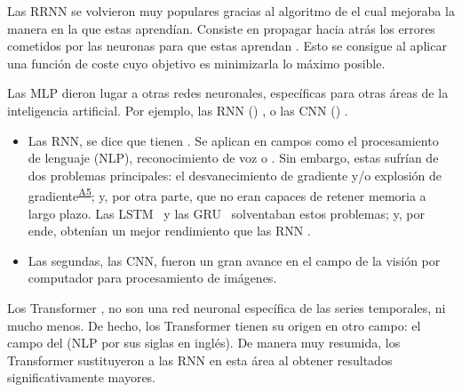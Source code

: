 {\begin{figure}[H]
\end{figure}
Las RRNN se volvieron muy populares gracias al algoritmo de  \parencite{bp} el cual mejoraba la manera en la que estas aprendían. Consiste en propagar hacia atrás los errores cometidos por las neuronas para que estas aprendan . Esto se consigue al aplicar una función de coste cuyo objetivo es minimizarla lo máximo posible. 

Las MLP dieron lugar a otras redes neuronales, específicas para otras áreas de la inteligencia artificial. Por ejemplo, las RNN () \parencite{rnn}\fnm, o  las CNN () \parencite{cnn}. 

\begin{itemize}
    \item Las RNN, se dice que tienen . Se aplican en campos como el procesamiento de lenguaje (NLP), reconocimiento de voz o . Sin embargo, estas sufrían de dos problemas principales: el desvanecimiento de gradiente y/o explosión de  gradiente\textsuperscript{\hyperref[ap:grad]{A5}}; y, por otra parte, que no eran capaces de retener memoria a largo plazo. Las LSTM\fnm\ \parencite{lstm} y las GRU\fnm\ \parencite{gru} solventaban estos problemas; y, por ende, obtenían un mejor rendimiento que las RNN \parencite{rnnvslstmgru}.
    \item Las segundas, las CNN,  fueron  un gran avance en el campo de la visión por computador para procesamiento de imágenes. 
\end{itemize} 
\addtocounter{footnote}{1}
\addtocounter{footnote}{1}

\bigskip


\label{sec_informer}

Los Transformer \parencite{transformers}, no son una red neuronal específica de las series temporales, ni mucho menos. De hecho, los Transformer tienen su origen en otro campo: el campo del  (NLP por sus siglas en inglés). De manera muy resumida, los Transformer sustituyeron a las RNN en esta área al obtener resultados significativamente mayores\fnm.
       
}
